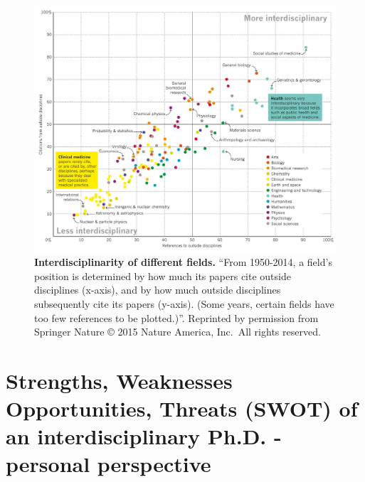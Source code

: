 \documentclass[12pt,]{book}
\theoremstyle{definition}
\theoremstyle{definition}
\theoremstyle{definition}
\theoremstyle{remark}
\begin{document}
\begin{figure}

{\centering \includegraphics[width=0.9\linewidth]{figures-ext/interdisciplinary} 

}

\caption[Interdisciplinarity of different fields.]{\textbf{Interdisciplinarity of different
fields.} ``From 1950-2014, a field's position is determined by how much
its papers cite outside disciplines (x-axis), and by how much outside
disciplines subsequently cite its papers (y-axis). (Some years, certain
fields have too few references to be plotted.)''. Reprinted by
permission from Springer Nature \citep{VanNoorden2015} © 2015 Nature
America, Inc.~All rights reserved.}\label{fig:interdisciplinary}
\end{figure}









\hypertarget{strengths-weaknesses-opportunities-threats-swot-of-an-interdisciplinary-ph.d.---personal-perspective}{%
\section*{Strengths, Weaknesses Opportunities, Threats (SWOT) of an
interdisciplinary Ph.D. - personal
perspective}\label{strengths-weaknesses-opportunities-threats-swot-of-an-interdisciplinary-ph.d.---personal-perspective}}
\end{document}
